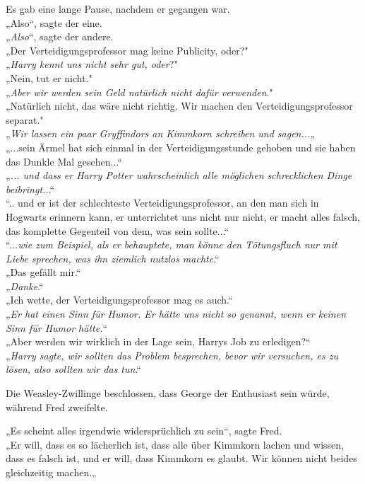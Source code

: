 {Es gab eine lange Pause, nachdem er gegangen war.\\ „Also“, sagte der eine.\\ „\emph{Also}“, sagte der andere.\\ „Der Verteidigungsprofessor mag keine Publicity, oder?"\\ „\emph{Harry kennt uns nicht sehr gut, oder}?"\\ „Nein, tut er nicht."\\ „\emph{Aber wir werden sein Geld natürlich nicht dafür verwenden}."\\ „Natürlich nicht, das wäre nicht richtig. Wir machen den Verteidigungsprofessor separat."\\ „\emph{Wir lassen ein paar Gryffindors an Kimmkorn schreiben und sagen...}„\\ „...sein Ärmel hat sich einmal in der Verteidigungsstunde gehoben und sie haben das Dunkle Mal gesehen...“\\ „\emph{... und dass er Harry Potter wahrscheinlich alle möglichen schrecklichen Dinge} \emph{beibringt..}.“\\ “.. und er ist der schlechteste Verteidigungsprofessor, an den man sich in Hogwarts erinnern kann, er unterrichtet uns nicht nur nicht, er macht alles falsch, das komplette Gegenteil von dem, was sein sollte...“\\ “.\emph{..wie zum Beispiel, als er behauptete, man könne den Tötungsfluch nur mit Liebe sprechen, was ihn ziemlich nutzlos machte}.“\\ „Das gefällt mir.“\\ „\emph{Danke}.“\\ „Ich wette, der Verteidigungsprofessor mag es auch.“\\ „\emph{Er hat einen Sinn für Humor. Er hätte uns nicht so genannt, wenn er keinen Sinn für Humor hätte.}“\\ „Aber werden wir wirklich in der Lage sein, Harrys Job zu erledigen?“\\ „\emph{Harry sagte, wir sollten das Problem besprechen, bevor wir versuchen, es zu lösen, also sollten wir das tun}.“

Die Weasley-Zwillinge beschlossen, dass George der Enthusiast sein würde, während Fred zweifelte.

„Es scheint alles irgendwie widersprüchlich zu sein“, sagte Fred.\\ „Er will, dass es so lächerlich ist, dass alle über Kimmkorn lachen und wissen, dass es falsch ist, und er will, dass Kimmkorn es glaubt. Wir können nicht beides gleichzeitig machen.„

}
